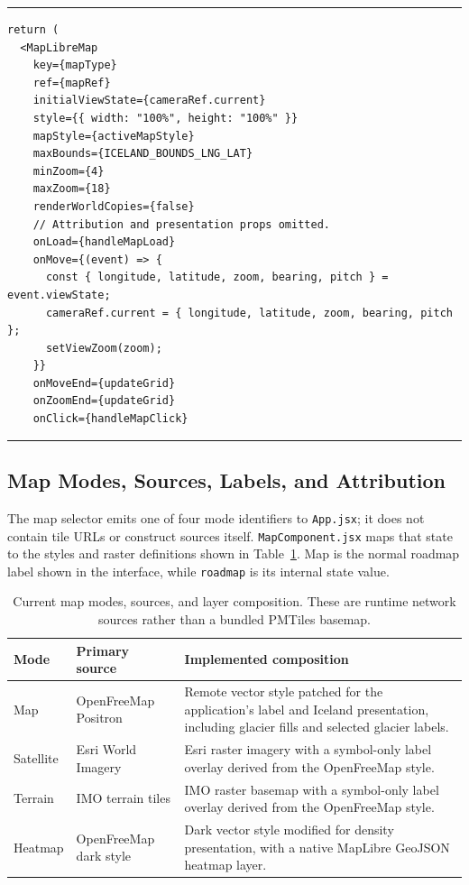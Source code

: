 \documentclass[12pt]{article}
\begin{document}
\begin{codelisting}[H]
\centering
\begin{minipage}{0.96\linewidth}
\hrule
\footnotesize
\begin{verbatim}
return (
  <MapLibreMap
    key={mapType}
    ref={mapRef}
    initialViewState={cameraRef.current}
    style={{ width: "100%", height: "100%" }}
    mapStyle={activeMapStyle}
    maxBounds={ICELAND_BOUNDS_LNG_LAT}
    minZoom={4}
    maxZoom={18}
    renderWorldCopies={false}
    // Attribution and presentation props omitted.
    onLoad={handleMapLoad}
    onMove={(event) => {
      const { longitude, latitude, zoom, bearing, pitch } = event.viewState;
      cameraRef.current = { longitude, latitude, zoom, bearing, pitch };
      setViewZoom(zoom);
    }}
    onMoveEnd={updateGrid}
    onZoomEnd={updateGrid}
    onClick={handleMapClick}
\end{verbatim}
\hrule
\end{minipage}
\caption{Keyed MapLibre map and persisted camera state in \texttt{MapComponent.jsx}.}
\label{lst:maplibre-camera}
\end{codelisting}

\subsection{Map Modes, Sources, Labels, and Attribution}
\label{subsec:frontend_map_modes}

The map selector emits one of four mode identifiers to \texttt{App.jsx}; it does not contain tile URLs or construct sources itself. \texttt{MapComponent.jsx} maps that state to the styles and raster definitions shown in Table~\ref{tab:current-map-sources}. Map is the normal roadmap label shown in the interface, while \texttt{roadmap} is its internal state value.

\begin{table}[H]
\centering
\caption{Current map modes, sources, and layer composition. These are runtime network sources rather than a bundled PMTiles basemap.}
\label{tab:current-map-sources}
\small
\setlength{\tabcolsep}{3pt}
\begin{tabular}{
    >{\raggedright\arraybackslash}p{2.0cm}
    >{\raggedright\arraybackslash}p{4.2cm}
    >{\raggedright\arraybackslash}p{7.4cm}}
\toprule
\textbf{Mode} & \textbf{Primary source} & \textbf{Implemented composition} \\
\midrule
Map & OpenFreeMap Positron & Remote vector style patched for the application's label and Iceland presentation, including glacier fills and selected glacier labels. \\
Satellite & Esri World Imagery & Esri raster imagery with a symbol-only label overlay derived from the OpenFreeMap style. \\
Terrain & IMO terrain tiles & IMO raster basemap with a symbol-only label overlay derived from the OpenFreeMap style. \\
Heatmap & OpenFreeMap dark style & Dark vector style modified for density presentation, with a native MapLibre GeoJSON heatmap layer. \\
\bottomrule
\end{tabular}
\end{table}
\end{document}
